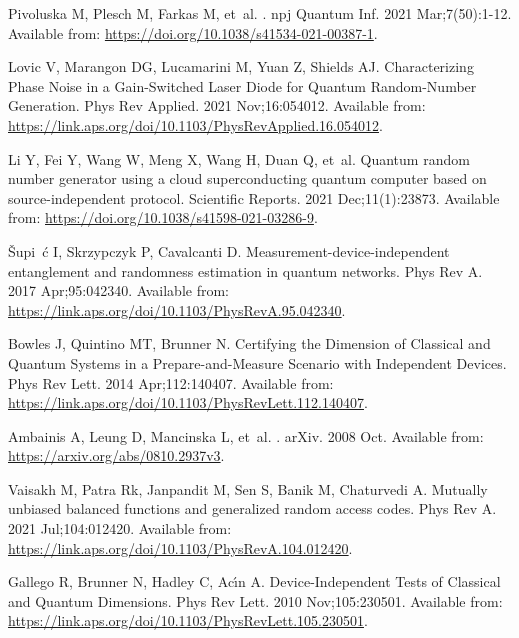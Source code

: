 \documentclass[]{interact}
\theoremstyle{plain}%
\theoremstyle{definition}
\theoremstyle{remark}
\begin{document}
\begin{thebibliography}{100}
Pivoluska M, Plesch M, Farkas M, et~al.
.
\newblock npj Quantum Inf. 2021 Mar;7(50):1-12.
\newblock Available from: \url{https://doi.org/10.1038/s41534-021-00387-1}.

Lovic V, Marangon DG, Lucamarini M, Yuan Z, Shields AJ.
\newblock Characterizing Phase Noise in a Gain-Switched Laser Diode for Quantum
  Random-Number Generation.
\newblock Phys Rev Applied. 2021 Nov;16:054012.
\newblock Available from:
  \url{https://link.aps.org/doi/10.1103/PhysRevApplied.16.054012}.

Li Y, Fei Y, Wang W, Meng X, Wang H, Duan Q, et~al.
\newblock Quantum random number generator using a cloud superconducting quantum
  computer based on source-independent protocol.
\newblock Scientific Reports. 2021 Dec;11(1):23873.
\newblock Available from: \url{https://doi.org/10.1038/s41598-021-03286-9}.

\ifmmode {}\else \v{S}\fi{}upi\ifmmode~\else \'{c}\fi{} I,
  Skrzypczyk P, Cavalcanti D.
\newblock Measurement-device-independent entanglement and randomness estimation
  in quantum networks.
\newblock Phys Rev A. 2017 Apr;95:042340.
\newblock Available from:
  \url{https://link.aps.org/doi/10.1103/PhysRevA.95.042340}.

Bowles J, Quintino MT, Brunner N.
\newblock Certifying the Dimension of Classical and Quantum Systems in a
  Prepare-and-Measure Scenario with Independent Devices.
\newblock Phys Rev Lett. 2014 Apr;112:140407.
\newblock Available from:
  \url{https://link.aps.org/doi/10.1103/PhysRevLett.112.140407}.

Ambainis A, Leung D, Mancinska L, et~al.
.
\newblock arXiv. 2008 Oct.
\newblock Available from: \url{https://arxiv.org/abs/0810.2937v3}.

{Vaisakh M}, Patra Rk, Janpandit M, Sen S, Banik M, Chaturvedi A.
\newblock Mutually unbiased balanced functions and generalized random access
  codes.
\newblock Phys Rev A. 2021 Jul;104:012420.
\newblock Available from:
  \url{https://link.aps.org/doi/10.1103/PhysRevA.104.012420}.

Gallego R, Brunner N, Hadley C, Ac\'{\i}n A.
\newblock Device-Independent Tests of Classical and Quantum Dimensions.
\newblock Phys Rev Lett. 2010 Nov;105:230501.
\newblock Available from:
  \url{https://link.aps.org/doi/10.1103/PhysRevLett.105.230501}.


\end{thebibliography}
\end{document}
